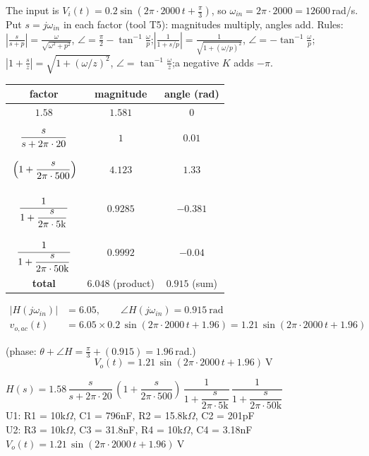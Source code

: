 \documentclass[11pt]{article}
\begin{document}
The input is $V_i(t) = 0.2\sin\left(2\pi\cdot 2000\,t+\frac{\pi}{3}\right)$, so $\omega_{in} = 2\pi\cdot 2000 = 12600$\,rad/s. Put $s=j\omega_{in}$ in each factor (tool T5): magnitudes multiply, angles add.
{\small Rules: $\left|\frac{s}{s+p}\right| = \frac{\omega}{\sqrt{\omega^2+p^2}}$, $\angle = \frac{\pi}{2}-\tan^{-1}\frac{\omega}{p}$;\quad $\left|\frac{1}{1+s/p}\right| = \frac{1}{\sqrt{1+(\omega/p)^2}}$, $\angle = -\tan^{-1}\frac{\omega}{p}$;\quad $\left|1+\frac{s}{z}\right| = \sqrt{1+(\omega/z)^2}$, $\angle = \tan^{-1}\frac{\omega}{z}$;\quad a negative $K$ adds $-\pi$.}
\begin{center}\renewcommand{\arraystretch}{1.35}
\begin{tabular}{ccc}
\toprule
factor & magnitude & angle (rad) \\
\midrule
$1.58$ & $1.581$ & $0$ \\
$\rule[-1.1em]{0pt}{2.8em}\dfrac{s}{s+2\pi\cdot 20}$ & $1$ & $0.01$ \\
$\rule[-1.1em]{0pt}{2.8em}\left(1+\dfrac{s}{2\pi\cdot 500}\right)$ & $4.123$ & $1.33$ \\
$\rule[-1.7em]{0pt}{4em}\dfrac{1}{1+\dfrac{s}{2\pi\cdot 5\mathrm{k}}}$ & $0.9285$ & $-0.381$ \\
$\rule[-1.7em]{0pt}{4em}\dfrac{1}{1+\dfrac{s}{2\pi\cdot 50\mathrm{k}}}$ & $0.9992$ & $-0.04$ \\
\textbf{total} & $\mathbf{6.048}$ (product) & $\mathbf{0.915}$ (sum) \\
\bottomrule
\end{tabular}\end{center}

\begin{align*}
|H(j\omega_{in})| &= 6.05, \qquad \angle H(j\omega_{in}) = 0.915\ \mathrm{rad} \\
v_{o,ac}(t) &= 6.05\times 0.2\,\sin\left(2\pi\cdot 2000\,t + 1.96\right) = 1.21\,\sin\left(2\pi\cdot 2000\,t + 1.96\right)
\end{align*}

(phase: $\theta + \angle H = \frac{\pi}{3} + (0.915) = 1.96$\,rad.)
\[
\boxed{V_o(t) = 1.21\,\sin\left(2\pi\cdot 2000\,t + 1.96\right)\ \mathrm{V}}
\]

\begin{ansbox}
$H(s) = 1.58\,\dfrac{s}{s+2\pi\cdot 20}\,\left(1+\dfrac{s}{2\pi\cdot 500}\right)\,\dfrac{1}{1+\dfrac{s}{2\pi\cdot 5\mathrm{k}}}\,\dfrac{1}{1+\dfrac{s}{2\pi\cdot 50\mathrm{k}}}$\\[4pt]
U1: R1 = 10k$\Omega$, C1 = 796nF, R2 = 15.8k$\Omega$, C2 = 201pF\\
U2: R3 = 10k$\Omega$, C3 = 31.8nF, R4 = 10k$\Omega$, C4 = 3.18nF\\[4pt]
$V_o(t) = 1.21\,\sin\left(2\pi\cdot 2000\,t + 1.96\right)\ \mathrm{V}$
\end{ansbox}
\end{document}
